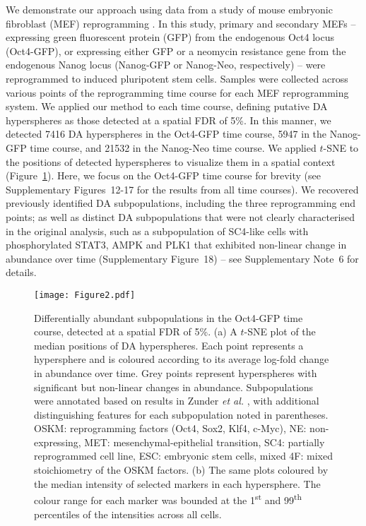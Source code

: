 \documentclass{article}
\newcommand{\suppsecmef}{6}
\newcommand{\suppfigrealextra}{12-17}
\newcommand{\suppfignonlinear}{18}
\begin{document}
We demonstrate our approach using data from a study of mouse embryonic fibroblast (MEF) reprogramming \cite{zunder2015continuous}.
In this study, primary and secondary MEFs 
-- expressing green fluorescent protein (GFP) from the endogenous Oct4 locus (Oct4-GFP),
or expressing either GFP or a neomycin resistance gene from the endogenous Nanog locus (Nanog-GFP or Nanog-Neo, respectively) -- 
were reprogrammed to induced pluripotent stem cells.
Samples were collected across various points of the reprogramming time course for each MEF reprogramming system.
We applied our method to each time course, defining putative DA hyperspheres as those detected at a spatial FDR of 5\%.
In this manner, we detected 7416 DA hyperspheres in the Oct4-GFP time course, 5947 in the Nanog-GFP time course, and 21532 in the Nanog-Neo time course.
We applied $t$-SNE \cite{van2008visualizing} to the positions of detected hyperspheres to visualize them in a spatial context (Figure~\ref{fig:oct4}).
Here, we focus on the Oct4-GFP time course for brevity (see Supplementary Figures~\suppfigrealextra{} for the results from all time courses).
We recovered previously identified DA subpopulations, including the three reprogramming end points; as well as distinct DA subpopulations that were not clearly characterised in the original analysis, such as a subpopulation of SC4-like cells with phosphorylated STAT3, AMPK and PLK1 that exhibited non-linear change in abundance over time (Supplementary Figure~\suppfignonlinear{}) -- see Supplementary Note~\suppsecmef{} for details.

\begin{figure}[p]
    \begin{center}
    \texttt{[image: Figure2.pdf]}
\end{center}
    \caption{
        Differentially abundant subpopulations in the Oct4-GFP time course, detected at a spatial FDR of 5\%.
        (a) A $t$-SNE plot of the median positions of DA hyperspheres. 
        Each point represents a hypersphere and is coloured according to its average log-fold change in abundance over time.
        Grey points represent hyperspheres with significant but non-linear changes in abundance.
        Subpopulations were annotated based on results in Zunder \emph{et al.} \cite{zunder2015continuous}, with additional distinguishing features for each subpopulation noted in parentheses.
        OSKM: reprogramming factors (Oct4, Sox2, Klf4, c-Myc), NE: non-expressing, MET: mesenchymal-epithelial transition, SC4: partially reprogrammed cell line, ESC: embryonic stem cells, mixed 4F: mixed stoichiometry of the OSKM factors.
        (b) The same plots coloured by the median intensity of selected markers in each hypersphere.
        The colour range for each marker was bounded at the 1\textsuperscript{st} and 99\textsuperscript{th} percentiles of the intensities across all cells.
    }
    \label{fig:oct4}
\end{figure}
\end{document}
